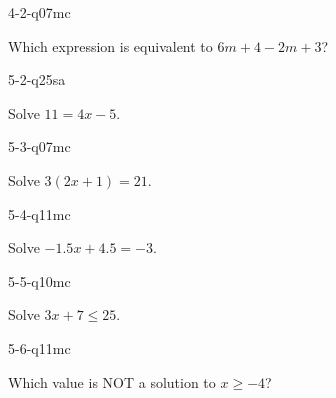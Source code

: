 \begin{practiceQuestion}{4-2-q07}{mc}
\begin{questionText}
Which expression is equivalent to $6m + 4 - 2m + 3$?
\end{questionText}
\end{practiceQuestion}

\begin{practiceQuestion}{5-2-q25}{sa}
\begin{questionText}
Solve $11 = 4x - 5$.
\end{questionText}
\end{practiceQuestion}

\begin{practiceQuestion}{5-3-q07}{mc}
\begin{questionText}
Solve $3(2x + 1) = 21$.
\end{questionText}
\end{practiceQuestion}

\begin{practiceQuestion}{5-4-q11}{mc}
\begin{questionText}
Solve $-1.5x + 4.5 = -3$.
\end{questionText}
\end{practiceQuestion}

\begin{practiceQuestion}{5-5-q10}{mc}
\begin{questionText}
Solve $3x + 7 \leq 25$.
\end{questionText}
\end{practiceQuestion}

\begin{practiceQuestion}{5-6-q11}{mc}
\begin{questionText}
Which value is NOT a solution to $x \geq -4$?
\end{questionText}
\end{practiceQuestion}

